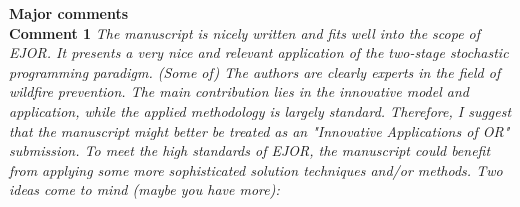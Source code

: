 \documentclass[12pt]{article}
\begin{document}
\noindent \textbf{Major comments}\\

\noindent \textbf{Comment 1} \textit{The manuscript is nicely written and fits well into the scope of EJOR. It presents a very nice and relevant application of the two-stage stochastic programming paradigm. (Some of) The authors are clearly experts in the field of wildfire prevention. The main contribution lies in the innovative model and application, while the applied methodology is largely standard. Therefore, I suggest that the manuscript might better be treated as an "Innovative Applications of OR" submission. To meet the high standards of EJOR, the manuscript could benefit from applying some more sophisticated solution techniques and/or methods. Two ideas come to mind (maybe you have more):}\\
\end{document}
